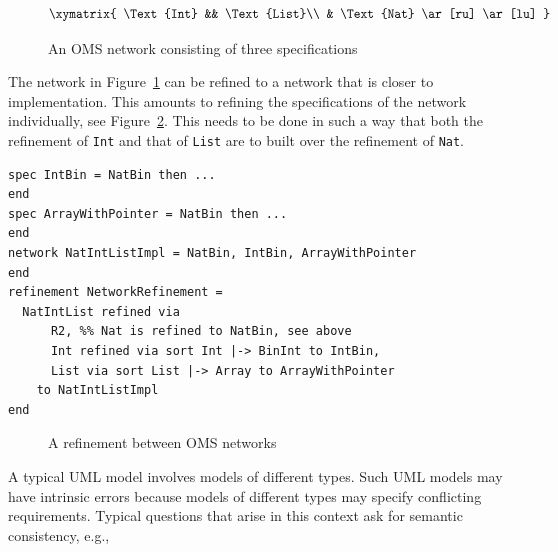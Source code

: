 \documentclass[10pt, a4paper]{isov2}
\newcommand*{\syntax}[1]{\texttt{#1}}
\begin{document}
\begin{figure}
$$\xymatrix{
\Text{Int} && \Text{List}\\
& \Text{Nat} \ar[ru] \ar[lu]
}$$
\caption{An OMS network consisting of three specifications
\label{fig:simple-network}}
\end{figure}

The network in Figure~\ref{fig:simple-network} can be refined
to a network that is closer to implementation.
This amounts to refining the specifications of the network
individually, see Figure~\ref{fig:simple-network-refinement}.
This needs to be done in such a way that both the refinement of \syntax{Int}
and that of \syntax{List} are to built over the refinement of \syntax{Nat}.
\begin{lstlisting}[basicstyle=\ttfamily\footnotesize,language=dolText,alsolanguage=CASL,escapechar=@,mathescape]
spec IntBin = NatBin then ...
end
spec ArrayWithPointer = NatBin then ...
end
network NatIntListImpl = NatBin, IntBin, ArrayWithPointer
end
refinement NetworkRefinement =
  NatIntList refined via
      R2, %% Nat is refined to NatBin, see above
      Int refined via sort Int |-> BinInt to IntBin,
      List via sort List |-> Array to ArrayWithPointer
    to NatIntListImpl
end
\end{lstlisting}



\begin{figure}
\caption{A refinement between OMS networks
\label{fig:simple-network-refinement}}
\end{figure}



\label{model-1}

A typical UML model involves models of different types. Such UML models may have intrinsic errors because models of different types may specify conflicting
requirements. Typical questions that arise in this context ask for
semantic consistency, e.g.,
\end{document}
